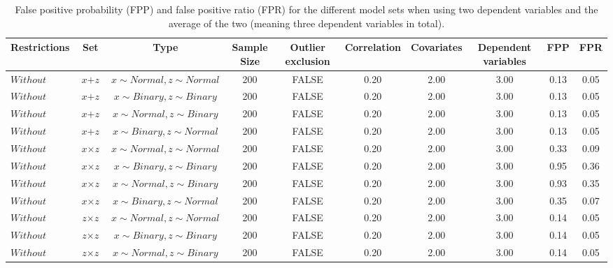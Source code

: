 \begin{longtable}{lccccccccc}
\caption{False positive probability (FPP) and false positive ratio (FPR) for the different model sets when using two dependent variables and the average of the two (meaning three dependent variables in total).} \\ 
  \hline
Restrictions & Set & Type & Sample Size & Outlier exclusion & Correlation & Covariates & Dependent variables & FPP & FPR \\ 
  \hline
$Without$ & $\textit{x} + \textit{z}$ & $\textit{x} \sim Normal , \textit{z} \sim Normal$ & 200 & FALSE & 0.20 & 2.00 & 3.00 & 0.13 & 0.05 \\ 
  $Without$ & $\textit{x} + \textit{z}$ & $\textit{x} \sim Binary, \textit{z} \sim Binary$ & 200 & FALSE & 0.20 & 2.00 & 3.00 & 0.13 & 0.05 \\ 
  $Without$ & $\textit{x} + \textit{z}$ & $\textit{x} \sim Normal, \textit{z} \sim Binary$ & 200 & FALSE & 0.20 & 2.00 & 3.00 & 0.13 & 0.05 \\ 
  $Without$ & $\textit{x} + \textit{z}$ & $\textit{x} \sim Binary, \textit{z} \sim Normal$ & 200 & FALSE & 0.20 & 2.00 & 3.00 & 0.13 & 0.05 \\ 
  $Without$ & $\textit{x} \times \textit{z}$ & $\textit{x} \sim Normal , \textit{z} \sim Normal$ & 200 & FALSE & 0.20 & 2.00 & 3.00 & 0.33 & 0.09 \\ 
  $Without$ & $\textit{x} \times \textit{z}$ & $\textit{x} \sim Binary, \textit{z} \sim Binary$ & 200 & FALSE & 0.20 & 2.00 & 3.00 & 0.95 & 0.36 \\ 
  $Without$ & $\textit{x} \times \textit{z}$ & $\textit{x} \sim Normal, \textit{z} \sim Binary$ & 200 & FALSE & 0.20 & 2.00 & 3.00 & 0.93 & 0.35 \\ 
  $Without$ & $\textit{x} \times \textit{z}$ & $\textit{x} \sim Binary, \textit{z} \sim Normal$ & 200 & FALSE & 0.20 & 2.00 & 3.00 & 0.35 & 0.07 \\ 
  $Without$ & $\textit{z} \times \textit{z}$ & $\textit{x} \sim Normal , \textit{z} \sim Normal$ & 200 & FALSE & 0.20 & 2.00 & 3.00 & 0.14 & 0.05 \\ 
  $Without$ & $\textit{z} \times \textit{z}$ & $\textit{x} \sim Binary, \textit{z} \sim Binary$ & 200 & FALSE & 0.20 & 2.00 & 3.00 & 0.14 & 0.05 \\ 
  $Without$ & $\textit{z} \times \textit{z}$ & $\textit{x} \sim Normal, \textit{z} \sim Binary$ & 200 & FALSE & 0.20 & 2.00 & 3.00 & 0.14 & 0.05 \\ 

\end{longtable}
